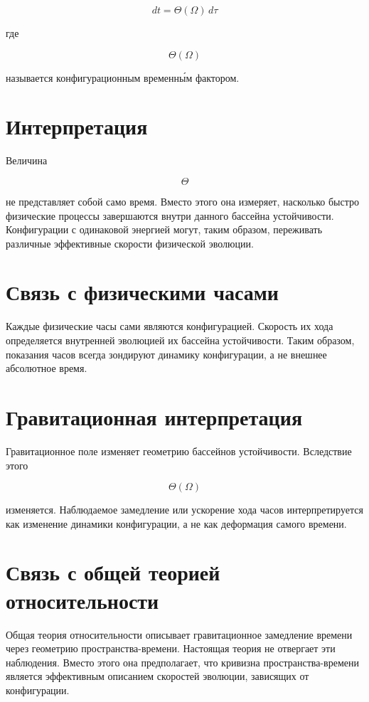 \[ \boxed{ dt = \Theta(\Omega)\,d\tau } \]

где

\[ \Theta(\Omega) \]

называется конфигурационным временны́м фактором.

\section{Интерпретация}

Величина

\[ \Theta \]

не представляет собой само время. Вместо этого она измеряет, насколько быстро физические процессы завершаются внутри данного бассейна устойчивости. Конфигурации с одинаковой энергией могут, таким образом, переживать различные эффективные скорости физической эволюции.

\section{Связь с физическими часами}

Каждые физические часы сами являются конфигурацией. Скорость их хода определяется внутренней эволюцией их бассейна устойчивости. Таким образом, показания часов всегда зондируют динамику конфигурации, а не внешнее абсолютное время.

\section{Гравитационная интерпретация}

Гравитационное поле изменяет геометрию бассейнов устойчивости. Вследствие этого

\[ \Theta(\Omega) \]

изменяется. Наблюдаемое замедление или ускорение хода часов интерпретируется как изменение динамики конфигурации, а не как деформация самого времени.

\section{Связь с общей теорией относительности}

Общая теория относительности описывает гравитационное замедление времени через геометрию пространства-времени. Настоящая теория не отвергает эти наблюдения. Вместо этого она предполагает, что кривизна пространства-времени является эффективным описанием скоростей эволюции, зависящих от конфигурации.

